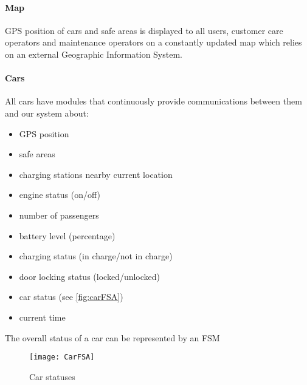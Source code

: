 	\paragraph{Map} GPS position of cars and safe areas is displayed to all users, customer care operators and maintenance operators on a constantly updated map which relies on an external Geographic Information System.

	\paragraph{Cars}\label{sec:cars}All cars have modules that continuously provide communications between them and our system about:
	\begin{itemize}
		\item GPS position
		\item safe areas
		\item charging stations nearby current location
		\item engine status (on/off)
		\item number of passengers
		\item battery level (percentage)
		\item charging status (in charge/not in charge)
		\item door locking status (locked/unlocked)
		\item car status (see \autoref{fig:carFSA})
		\item current time
	\end{itemize}	
	The overall status of a car can be represented by an FSM
	\begin{figure}[h]
			\centering
			\texttt{[image: CarFSA]}
			\caption{
				\label{fig:carFSA} 
				Car statuses
			}
		\end{figure}
		
